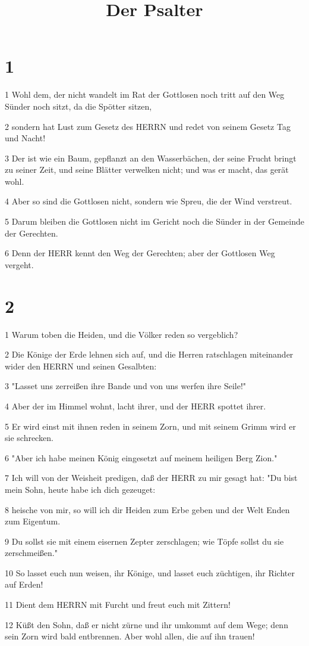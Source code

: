

\title{Der Psalter}


\chapter{1}

\par 1 Wohl dem, der nicht wandelt im Rat der Gottlosen noch tritt auf den Weg Sünder noch sitzt, da die Spötter sitzen,
\par 2 sondern hat Lust zum Gesetz des HERRN und redet von seinem Gesetz Tag und Nacht!
\par 3 Der ist wie ein Baum, gepflanzt an den Wasserbächen, der seine Frucht bringt zu seiner Zeit, und seine Blätter verwelken nicht; und was er macht, das gerät wohl.
\par 4 Aber so sind die Gottlosen nicht, sondern wie Spreu, die der Wind verstreut.
\par 5 Darum bleiben die Gottlosen nicht im Gericht noch die Sünder in der Gemeinde der Gerechten.
\par 6 Denn der HERR kennt den Weg der Gerechten; aber der Gottlosen Weg vergeht.

\chapter{2}

\par 1 Warum toben die Heiden, und die Völker reden so vergeblich?
\par 2 Die Könige der Erde lehnen sich auf, und die Herren ratschlagen miteinander wider den HERRN und seinen Gesalbten:
\par 3 "Lasset uns zerreißen ihre Bande und von uns werfen ihre Seile!"
\par 4 Aber der im Himmel wohnt, lacht ihrer, und der HERR spottet ihrer.
\par 5 Er wird einst mit ihnen reden in seinem Zorn, und mit seinem Grimm wird er sie schrecken.
\par 6 "Aber ich habe meinen König eingesetzt auf meinem heiligen Berg Zion."
\par 7 Ich will von der Weisheit predigen, daß der HERR zu mir gesagt hat: "Du bist mein Sohn, heute habe ich dich gezeuget:
\par 8 heische von mir, so will ich dir Heiden zum Erbe geben und der Welt Enden zum Eigentum.
\par 9 Du sollst sie mit einem eisernen Zepter zerschlagen; wie Töpfe sollst du sie zerschmeißen."
\par 10 So lasset euch nun weisen, ihr Könige, und lasset euch züchtigen, ihr Richter auf Erden!
\par 11 Dient dem HERRN mit Furcht und freut euch mit Zittern!
\par 12 Küßt den Sohn, daß er nicht zürne und ihr umkommt auf dem Wege; denn sein Zorn wird bald entbrennen. Aber wohl allen, die auf ihn trauen!

